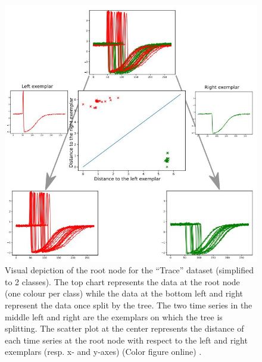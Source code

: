 \begin{figure}[!htbp]
    \captionsetup{justification=raggedright}
    \centering
    \includegraphics[scale = 0.5]{PForest.JPG}
    \caption{Visual depiction of the root node for the \enquote{Trace} dataset (simplified to 2 classes). The top chart represents the data at the root node (one colour per class) while the data at the bottom left and right represent the data once split by the tree. The two time series in the middle left and right are the exemplars on which the tree is splitting. The scatter plot at the center represents the distance of each time series at the root node with respect to the left and right exemplars (resp. x- and y-axes) (Color figure online) \cite{lucas2019proximity}.}
    \label{Img:PForest}
\end{figure}


